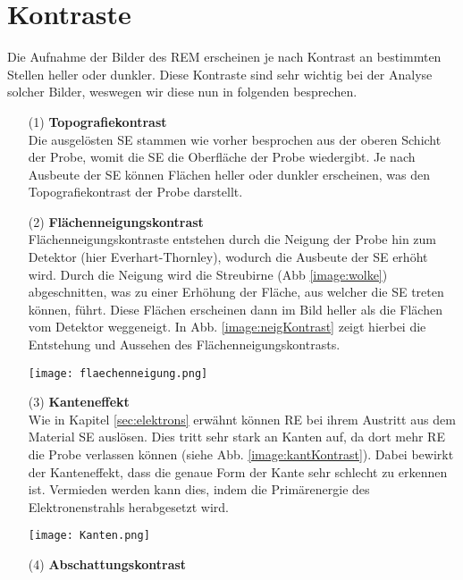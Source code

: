\section{Kontraste}
\label{sec:kontrast}
Die Aufnahme der Bilder des REM erscheinen je nach Kontrast an bestimmten Stellen heller oder dunkler. Diese Kontraste sind sehr wichtig bei der Analyse solcher Bilder, weswegen wir diese nun in folgenden besprechen.
\begin{itemize}
    \item[(1)]\textbf{Topografiekontrast}\\
    Die ausgelösten SE stammen wie vorher besprochen aus der oberen Schicht der Probe, womit die SE die Oberfläche der Probe wiedergibt. Je nach Ausbeute der SE können Flächen heller oder dunkler erscheinen, was den Topografiekontrast der Probe darstellt.
    \item[(2)]\textbf{Flächenneigungskontrast}\\
    Flächenneigungskontraste entstehen durch die Neigung der Probe hin zum Detektor (hier Everhart-Thornley), wodurch die Ausbeute der SE erhöht wird. Durch die Neigung wird die Streubirne (Abb \ref{image:wolke}) abgeschnitten, was zu einer Erhöhung der Fläche, aus welcher die SE treten können, führt. Diese Flächen erscheinen dann im Bild heller als die Flächen vom Detektor weggeneigt. In Abb. \ref{image:neigKontrast} zeigt hierbei die Entstehung und Aussehen des Flächenneigungskontrasts.
    \begin{center}
        \texttt{[image: flaechenneigung.png]}
        \label{image:neigKontrast}
    \end{center}
    \item[(3)]\textbf{Kanteneffekt}\\
    Wie in Kapitel \ref{sec:elektrons} erwähnt können RE bei ihrem Austritt aus dem Material SE auslösen. Dies tritt sehr stark an Kanten auf, da dort mehr RE die Probe verlassen können (siehe Abb. \ref{image:kantKontrast}). Dabei bewirkt der Kanteneffekt, dass die genaue Form der Kante sehr schlecht zu erkennen ist. Vermieden werden kann dies, indem die Primärenergie des Elektronenstrahls herabgesetzt wird.
    \begin{center}
        \texttt{[image: Kanten.png]}
        \label{image:kantKontrast}
    \end{center}
    \item[(4)]\textbf{Abschattungskontrast}\\

\end{itemize}
